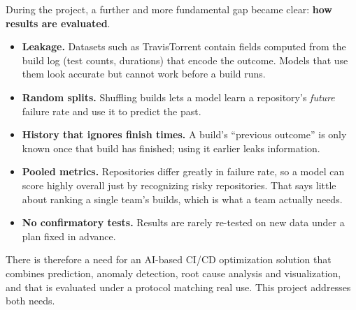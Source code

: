 During the project, a further and more fundamental gap became clear: \textbf{how results are evaluated}.
\begin{itemize}
\item \textbf{Leakage.} Datasets such as TravisTorrent contain fields computed from the build log (test counts, durations) that encode the outcome. Models that use them look accurate but cannot work before a build runs.
\item \textbf{Random splits.} Shuffling builds lets a model learn a repository's \emph{future} failure rate and use it to predict the past.
\item \textbf{History that ignores finish times.} A build's ``previous outcome'' is only known once that build has finished; using it earlier leaks information.
\item \textbf{Pooled metrics.} Repositories differ greatly in failure rate, so a model can score highly overall just by recognizing risky repositories. That says little about ranking a single team's builds, which is what a team actually needs.
\item \textbf{No confirmatory tests.} Results are rarely re-tested on new data under a plan fixed in advance.
\end{itemize}
There is therefore a need for an AI-based CI/CD optimization solution that combines prediction, anomaly detection, root cause analysis and visualization, and that is evaluated under a protocol matching real use. This project addresses both needs.
